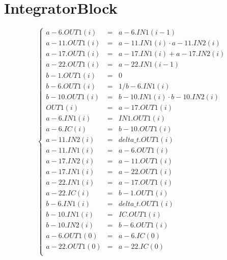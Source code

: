 \documentclass{article}
\begin{document}
\section{IntegratorBlock}
$$
\left\{\begin{array}{lcl}
	a-6.OUT1(i) &=& a-6.IN1\left(i-1\right)\\
	a-11.OUT1(i) &=& a-11.IN1\left(i\right) \cdot  a-11.IN2\left(i\right)\\
	a-17.OUT1(i) &=& a-17.IN1\left(i\right) + a-17.IN2\left(i\right)\\
	a-22.OUT1(i) &=& a-22.IN1\left(i-1\right)\\
	b-1.OUT1(i) &=& 0\\
	b-6.OUT1(i) &=& 1/b-6.IN1\left(i\right)\\
	b-10.OUT1(i) &=& b-10.IN1\left(i\right) \cdot  b-10.IN2\left(i\right)\\
	OUT1(i) &=& a-17.OUT1\left(i\right)\\
	a-6.IN1(i) &=& IN1.OUT1\left(i\right)\\
	a-6.IC(i) &=& b-10.OUT1\left(i\right)\\
	a-11.IN2(i) &=& delta\_t.OUT1\left(i\right)\\
	a-11.IN1(i) &=& a-6.OUT1\left(i\right)\\
	a-17.IN2(i) &=& a-11.OUT1\left(i\right)\\
	a-17.IN1(i) &=& a-22.OUT1\left(i\right)\\
	a-22.IN1(i) &=& a-17.OUT1\left(i\right)\\
	a-22.IC(i) &=& b-1.OUT1\left(i\right)\\
	b-6.IN1(i) &=& delta\_t.OUT1\left(i\right)\\
	b-10.IN1(i) &=& IC.OUT1\left(i\right)\\
	b-10.IN2(i) &=& b-6.OUT1\left(i\right)\\
	a-6.OUT1(0) &=& a-6.IC(0)\\
	a-22.OUT1(0) &=& a-22.IC(0)\\
\end{array}\right.
$$
\end{document}
